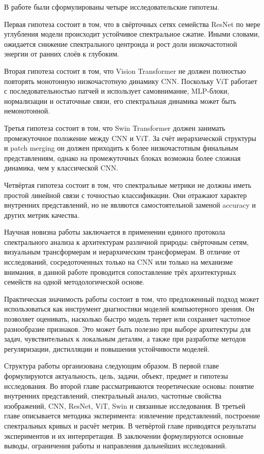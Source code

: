 В работе были сформулированы четыре исследовательские гипотезы.

Первая гипотеза состоит в том, что в свёрточных сетях семейства ResNet по мере углубления модели происходит устойчивое спектральное сжатие. Иными словами, ожидается снижение спектрального центроида и рост доли низкочастотной энергии от ранних слоёв к глубоким.

Вторая гипотеза состоит в том, что Vision Transformer не должен полностью повторять монотонную низкочастотную динамику CNN. Поскольку ViT работает с последовательностью патчей и использует самовнимание, MLP-блоки, нормализации и остаточные связи, его спектральная динамика может быть немонотонной.

Третья гипотеза состоит в том, что Swin Transformer должен занимать промежуточное положение между CNN и ViT. За счёт иерархической структуры и patch merging он должен приходить к более низкочастотным финальным представлениям, однако на промежуточных блоках возможна более сложная динамика, чем у классической CNN.

Четвёртая гипотеза состоит в том, что спектральные метрики не должны иметь простой линейной связи с точностью классификации. Они отражают характер внутренних представлений, но не являются самостоятельной заменой accuracy и других метрик качества.

Научная новизна работы заключается в применении единого протокола спектрального анализа к архитектурам различной природы: свёрточным сетям, визуальным трансформерам и иерархическим трансформерам. В отличие от исследований, сосредоточенных только на CNN или только на механизме внимания, в данной работе проводится сопоставление трёх архитектурных семейств на одной методологической основе.

Практическая значимость работы состоит в том, что предложенный подход может использоваться как инструмент диагностики моделей компьютерного зрения. Он позволяет оценивать, насколько быстро модель теряет или сохраняет частотное разнообразие признаков. Это может быть полезно при выборе архитектуры для задач, чувствительных к локальным деталям, а также при разработке методов регуляризации, дистилляции и повышения устойчивости моделей.

Структура работы организована следующим образом. В первой главе формулируются актуальность, цель, задачи, объект, предмет и гипотезы исследования. Во второй главе рассматриваются теоретические основы: понятие внутренних представлений, спектральный анализ, частотные свойства изображений, CNN, ResNet, ViT, Swin и связанные исследования. В третьей главе описывается методика эксперимента: извлечение представлений, построение спектральных кривых и расчёт метрик. В четвёртой главе приводятся результаты экспериментов и их интерпретация. В заключении формулируются основные выводы, ограничения работы и направления дальнейших исследований.
